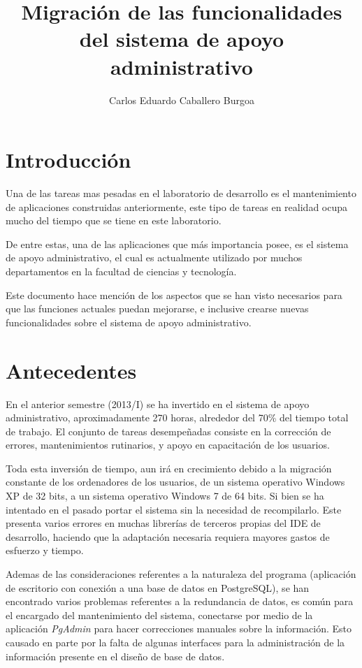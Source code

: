 \documentclass[letterpaper,11pt]{article}
\title{Migración de las funcionalidades del sistema de apoyo administrativo}
\author{Carlos Eduardo Caballero Burgoa}
\begin{document}
\maketitle
\section{Introducción}
Una de las tareas mas pesadas en el laboratorio de desarrollo es el 
mantenimiento de aplicaciones construidas anteriormente, este tipo de tareas en
realidad ocupa mucho del tiempo que se tiene en este laboratorio.

De entre estas, una de las aplicaciones que más importancia posee, es el
sistema de apoyo administrativo, el cual es actualmente utilizado por muchos
departamentos en la facultad de ciencias y tecnología.

Este documento hace mención de los aspectos que se han visto necesarios para
que las funciones actuales puedan mejorarse, e inclusive crearse nuevas
funcionalidades sobre el sistema de apoyo administrativo.

\section{Antecedentes}
En el anterior semestre (2013/I) se ha invertido en el sistema de apoyo
administrativo, aproximadamente 270 horas, alrededor del 70\% del tiempo
total de trabajo. El conjunto de tareas desempeñadas consiste en la corrección
de errores, mantenimientos rutinarios, y apoyo en capacitación de los usuarios.

Toda esta inversión de tiempo, aun irá en crecimiento debido a la migración
constante de los ordenadores de los usuarios, de un sistema operativo Windows
XP de 32 bits, a un sistema operativo Windows 7 de 64 bits. Si bien se ha
intentado en el pasado portar el sistema sin la necesidad de recompilarlo. Este
presenta varios errores en muchas librerías de terceros propias del IDE de
desarrollo, haciendo que la adaptación necesaria requiera mayores gastos de
esfuerzo y tiempo\cite{Delphi1}.

Ademas de las consideraciones referentes a la naturaleza del programa
(aplicación de escritorio con conexión a una base de datos en PostgreSQL), se 
han encontrado varios problemas referentes a la redundancia de datos, es común
para el encargado del mantenimiento del sistema, conectarse por medio de la
aplicación \emph{PgAdmin} para hacer correcciones manuales sobre la
información. Esto causado en parte por la falta de algunas interfaces para la
administración de la información presente en el diseño de base de datos.
\end{document}
